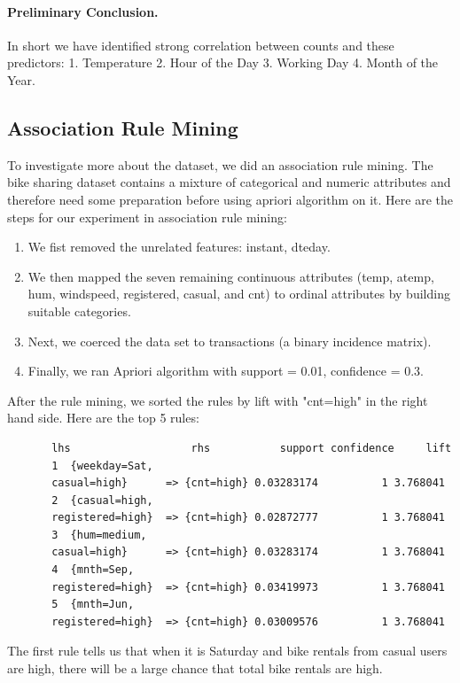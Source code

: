 \documentclass[12pt]{article}
\begin{document}
	\paragraph*{Preliminary Conclusion.}	
	In short we have identified strong correlation between counts and these predictors: 1. Temperature 2. Hour of the Day 3. Working Day 4. Month of the Year. 
	
	\subsection{Association Rule Mining}	
	To investigate more about the dataset, we did an association rule mining. The bike sharing dataset contains a mixture of categorical and numeric attributes and therefore need some preparation before using apriori algorithm on it. Here are the steps for our experiment in association rule mining:
    \begin{enumerate}
    	\item We fist removed the unrelated features: instant, dteday.
    	\item We then mapped the seven remaining continuous attributes (temp, atemp, hum, windspeed, registered, casual, and cnt) to ordinal attributes by building suitable categories.
    	\item Next, we coerced the data set to transactions (a binary incidence matrix).
    	\item Finally, we ran Apriori algorithm with support = 0.01, confidence = 0.3.
    \end{enumerate}
	
	After the rule mining, we sorted the rules by lift with "cnt=high" in the right hand side. Here are the top 5 rules: \color{blue}
	\begin{verbatim}
	   lhs                   rhs           support confidence     lift
	   1  {weekday=Sat,                                                  
	   casual=high}      => {cnt=high} 0.03283174          1 3.768041
	   2  {casual=high,                                                  
	   registered=high}  => {cnt=high} 0.02872777          1 3.768041
	   3  {hum=medium,                                                   
	   casual=high}      => {cnt=high} 0.03283174          1 3.768041
	   4  {mnth=Sep,                                                     
	   registered=high}  => {cnt=high} 0.03419973          1 3.768041
	   5  {mnth=Jun,                                                     
	   registered=high}  => {cnt=high} 0.03009576          1 3.768041
	\end{verbatim} \color{black}
    The first rule tells us that when it is Saturday and bike rentals from casual users are high, there will be a large chance that total bike rentals are high.
    
\end{document}
